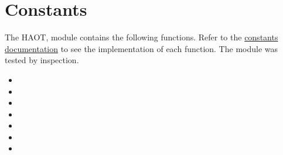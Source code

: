 \section{Constants \label{ch4:constants}}
The \gls{HAOT},  module contains the following
functions. Refer to the
\href{https://haot.readthedocs.io/en/latest/modules/constants.html}{constants documentation}
to see the implementation of each function. The 
module was tested by inspection.
\begin{itemize}
    \item {}
    \item {}
    \item {}
    \item {}
    \item {}
    \item {}
    \item {}
\end{itemize}

